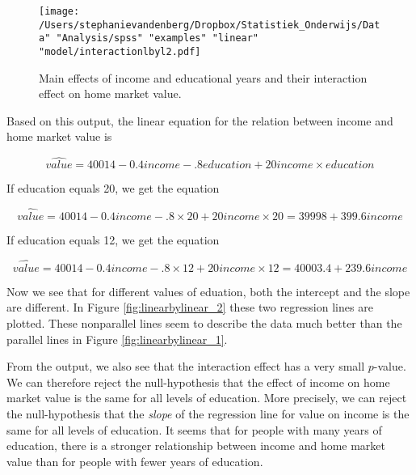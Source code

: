 \begin{figure}[h]
    \begin{center}
       \texttt{[image: /Users/stephanievandenberg/Dropbox/Statistiek\_Onderwijs/Data" "Analysis/spss" "examples"  "linear" "model/interactionlbyl2.pdf]}
    \end{center}
    \caption{Main effects of income and educational years and their interaction effect on home market value.}
    \label{fig:interactionlbyl2}
\end{figure}

Based on this output, the linear equation for the relation between income and home market value is 

\begin{equation}
\widehat{value}= 40014 -0.4 income -.8 education + 20 income \times education
\end{equation}

If education equals 20, we get the equation

\begin{equation}
\widehat{value}= 40014 -0.4 income -.8 \times 20 + 20 income \times 20 = 39998 + 399.6 income
\end{equation}

If education equals 12, we get the equation 

\begin{equation}
\widehat{value}= 40014 - 0.4 income -.8 \times 12 + 20 income \times 12 = 40003.4 + 239.6 income
\end{equation}

Now we see that for different values of eduation, both the intercept and the slope are different. In Figure \ref{fig:linearbylinear_2} these two regression lines are plotted. These nonparallel lines seem to describe the data much better than the parallel lines in Figure \ref{fig:linearbylinear_1}. 

\begin{kframe}


{\ttfamily\noindent\bfseries{}}

{\ttfamily\noindent\bfseries{}}\end{kframe}

From the output, we also see that the interaction effect has a very small $p$-value. We can therefore reject the null-hypothesis that the effect of income on home market value is the same for all levels of education. More precisely, we can reject the null-hypothesis that the \textit{slope} of the regression line for value on income is the same for all levels of education. It seems that for people with many years of education, there is a stronger relationship between income and home market value than for people with fewer years of education. 

